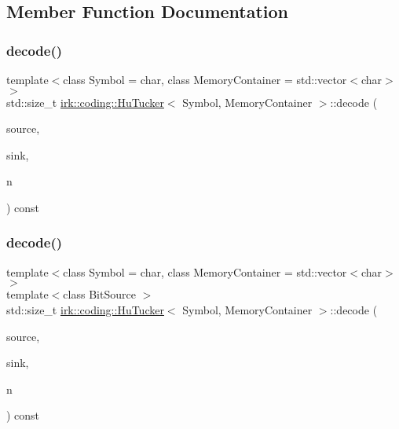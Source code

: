 \subsection{Member Function Documentation}
\mbox{\label{classirk_1_1coding_1_1HuTucker_aac96d2029fe7c11723546640c29417e0}} 
\subsubsection{\texorpdfstring{decode()}{decode()}\hspace{0.1cm}{\footnotesize\ttfamily [1/2]}}
{\footnotesize\ttfamily template$<$class Symbol  = char, class Memory\+Container  = std\+::vector$<$char$>$$>$ \\
std\+::size\+\_\+t \mbox{\hyperlink{classirk_1_1coding_1_1HuTucker}{irk\+::coding\+::\+Hu\+Tucker}}$<$ Symbol, Memory\+Container $>$\+::decode (\begin{DoxyParamCaption}\item[{const boost\+::dynamic\+\_\+bitset$<$ unsigned char $>$ \&}]{source,  }\item[{std\+::ostream \&}]{sink,  }\item[{std\+::size\+\_\+t}]{n }\end{DoxyParamCaption}) const\hspace{0.3cm}{\ttfamily [inline]}}

\mbox{\label{classirk_1_1coding_1_1HuTucker_a9ca634cc3bbe50b061655db9546b35a3}} 
\subsubsection{\texorpdfstring{decode()}{decode()}\hspace{0.1cm}{\footnotesize\ttfamily [2/2]}}
{\footnotesize\ttfamily template$<$class Symbol  = char, class Memory\+Container  = std\+::vector$<$char$>$$>$ \\
template$<$class Bit\+Source $>$ \\
std\+::size\+\_\+t \mbox{\hyperlink{classirk_1_1coding_1_1HuTucker}{irk\+::coding\+::\+Hu\+Tucker}}$<$ Symbol, Memory\+Container $>$\+::decode (\begin{DoxyParamCaption}\item[{Bit\+Source \&}]{source,  }\item[{std\+::ostream \&}]{sink,  }\item[{std\+::size\+\_\+t}]{n }\end{DoxyParamCaption}) const\hspace{0.3cm}{\ttfamily [inline]}}

